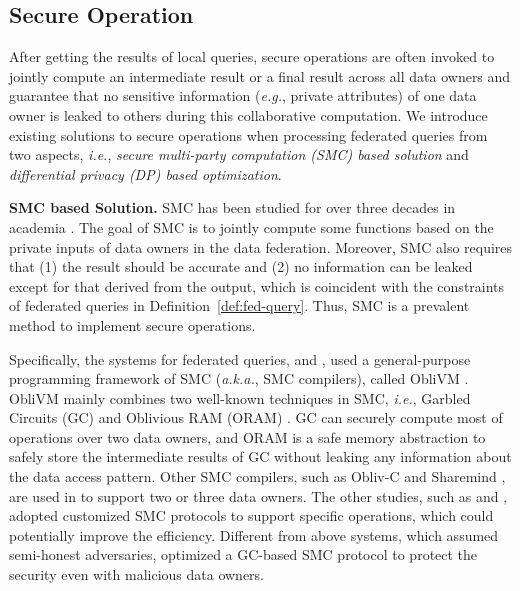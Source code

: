 \documentclass[11pt]{article}
\newcommand{\eg}{\textit{e.g.},\xspace}
\newcommand{\ie}{\textit{i.e.},\xspace}
\newcommand{\aka}{\textit{a.k.a.},\xspace}
\newcommand\defref[1]{Definition~\ref{#1}}
\newcommand{\fakeparagraph}[1]{\vspace{1mm}\noindent\textbf{#1.}}
\begin{document}
\subsection{Secure Operation}\label{sec:data-secure}

After getting the results of local queries, secure operations are often invoked to jointly compute an intermediate result or a final result across all data owners and guarantee that no sensitive information (\eg private attributes) of one data owner is leaked to others during this collaborative computation.
We introduce existing solutions to secure operations when processing federated queries from two aspects, \ie
\textit{secure multi-party computation (SMC) based solution} and \textit{differential privacy (DP) based optimization}. 

\fakeparagraph{SMC based Solution}
SMC has been studied for over three decades in academia \cite{DBLP:journals/cacm/Lindell21}.
The goal of SMC is to jointly compute some functions based on the private inputs of data owners in the data federation.
Moreover, SMC also requires that (1) the result should be accurate and (2) no information can be leaked except for that derived from the output, which is coincident with the constraints of federated queries in \defref{def:fed-query}.
Thus, SMC is a prevalent method to implement secure operations.

Specifically, the systems for federated queries, \SMCQL \cite{ref_bater2017smcql} and \Shrinkwrap \cite{ref_bater2018shrinkwrap}, used a general-purpose programming framework of SMC (\aka SMC compilers), called ObliVM \cite{DBLP:conf/sp/LiuWNHS15}.
ObliVM mainly combines two well-known techniques in SMC, \ie Garbled Circuits (GC) \cite{DBLP:conf/focs/Yao82b} and Oblivious RAM (ORAM) \cite{DBLP:journals/jacm/GoldreichO96}.
GC can securely compute most of operations over two data owners, and ORAM is a safe memory abstraction to safely store the intermediate results of GC without leaking any information about the data access pattern.
Other SMC compilers, such as Obliv-C \cite{DBLP:journals/iacr/ZahurE15} and Sharemind \cite{DBLP:conf/esorics/BogdanovLW08}, are used in \Conclave \cite{ref_volgushev2019conclave} to support two or three data owners.
The other studies, such as \cite{ref_tong2022hu} and \cite{dasfaa23aknn}, adopted customized SMC protocols to support specific operations, which could potentially improve the efficiency.
Different from above systems, which assumed semi-honest adversaries, \Senate \cite{DBLP:conf/uss/PoddarKYDPH21} optimized a GC-based SMC protocol \cite{DBLP:conf/ccs/WangRK17a} to protect the security even with malicious data owners.
\end{document}
